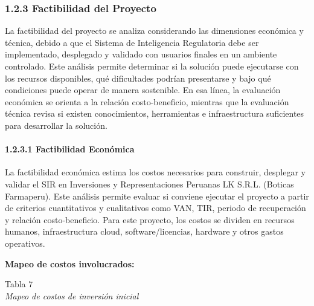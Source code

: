 \documentclass[12pt,a4paper,oneside]{report}
\begin{document}
\subsubsection{1.2.3 Factibilidad del
Proyecto}\label{factibilidad-del-proyecto}

La factibilidad del proyecto se analiza considerando las dimensiones
económica y técnica, debido a que el Sistema de Inteligencia Regulatoria
debe ser implementado, desplegado y validado con usuarios finales en un
ambiente controlado. Este análisis permite determinar si la solución
puede ejecutarse con los recursos disponibles, qué dificultades podrían
presentarse y bajo qué condiciones puede operar de manera sostenible. En
esa línea, la evaluación económica se orienta a la relación
costo-beneficio, mientras que la evaluación técnica revisa si existen
conocimientos, herramientas e infraestructura suficientes para
desarrollar la solución.

\paragraph{1.2.3.1 Factibilidad
Económica}\label{factibilidad-econuxf3mica}

La factibilidad económica estima los costos necesarios para construir,
desplegar y validar el SIR en Inversiones y Representaciones Peruanas LK
S.R.L. (Boticas Farmaperu). Este análisis permite evaluar si conviene
ejecutar el proyecto a partir de criterios cuantitativos y cualitativos
como VAN, TIR, periodo de recuperación y relación costo-beneficio. Para
este proyecto, los costos se dividen en recursos humanos,
infraestructura cloud, software/licencias, hardware y otros gastos
operativos.

\textbf{Mapeo de costos involucrados:}

\label{_Toc231672262}{}Tabla 7\\
\emph{Mapeo de costos de inversión inicial}
\end{document}
